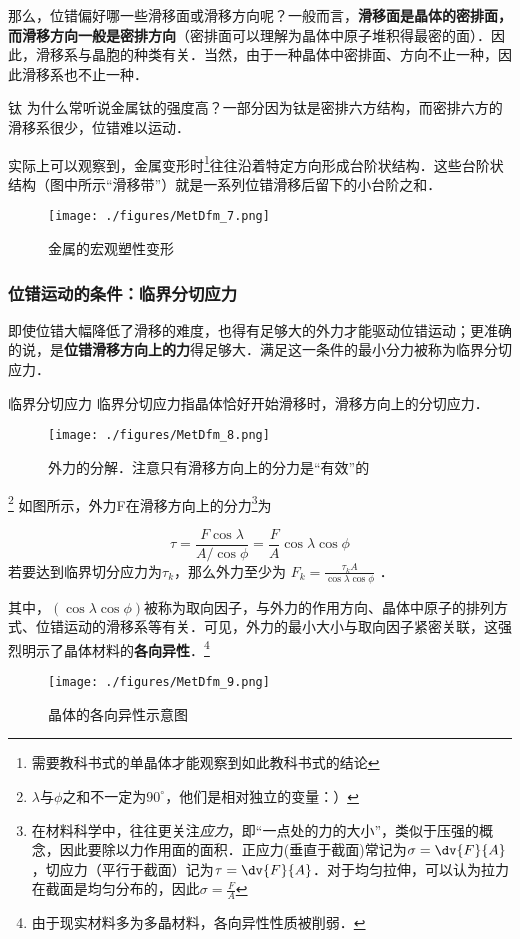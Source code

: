那么，位错偏好哪一些滑移面或滑移方向呢？一般而言，\textbf{滑移面是晶体的密排面，而滑移方向一般是密排方向}（密排面可以理解为晶体中原子堆积得最密的面）．因此，滑移系与晶胞的种类有关．当然，由于一种晶体中密排面、方向不止一种，因此滑移系也不止一种．

\begin{example}{钛}
为什么常听说金属钛的强度高？一部分因为钛是密排六方结构，而密排六方的滑移系很少，位错难以运动．
\end{example}

实际上可以观察到，金属变形时\footnote{需要教科书式的单晶体才能观察到如此教科书式的结论}往往沿着特定方向形成台阶状结构．这些台阶状结构（图中所示“滑移带”）就是一系列位错滑移后留下的小台阶之和．
\begin{figure}[ht]
\centering
\texttt{[image: ./figures/MetDfm\_7.png]}
\caption{金属的宏观塑性变形} \label{MetDfm_fig7}
\end{figure}

\subsubsection{位错运动的条件：临界分切应力}
即使位错大幅降低了滑移的难度，也得有足够大的外力才能驱动位错运动；更准确的说，是\textbf{位错滑移方向上的力}得足够大．满足这一条件的最小分力被称为临界分切应力．

\begin{definition}{临界分切应力}
临界分切应力指晶体恰好开始滑移时，滑移方向上的分切应力．
\end{definition}

\begin{figure}[ht]
\centering
\texttt{[image: ./figures/MetDfm\_8.png]}
\caption{外力的分解．注意只有滑移方向上的分力是“有效”的} \label{MetDfm_fig8}
\end{figure}
\footnote{$\lambda$与$\phi$之和不一定为$90^\circ$，他们是相对独立的变量：）}
如图所示，外力F在滑移方向上的分力\footnote{在材料科学中，往往更关注\textsl{应力}，即“一点处的力的大小”，类似于压强的概念，因此要除以力作用面的面积．正应力(垂直于截面)常记为$\sigma=\dv{F}{A}$，切应力（平行于截面）记为$\tau=\dv{F}{A}$．对于均匀拉伸，可以认为拉力在截面是均匀分布的，因此$\sigma=\frac{F}{A}$}为

$$\tau=\frac{F \cos \lambda}{A/{\cos \phi}}=\frac{F}{A}{\cos \lambda}{\cos \phi}$$
若要达到临界切分应力为$\tau_k$，那么外力至少为 $F_k=\frac{\tau_k A}{\cos \lambda \cos \phi} $ ．

其中，$(\cos \lambda \cos \phi)$被称为取向因子，与外力的作用方向、晶体中原子的排列方式、位错运动的滑移系等有关．可见，外力的最小大小与取向因子紧密关联，这强烈明示了晶体材料的\textbf{各向异性}．\footnote{由于现实材料多为多晶材料，各向异性性质被削弱．}

\begin{figure}[ht]
\centering
\texttt{[image: ./figures/MetDfm\_9.png]}
\caption{晶体的各向异性示意图} \label{MetDfm_fig9}
\end{figure}
